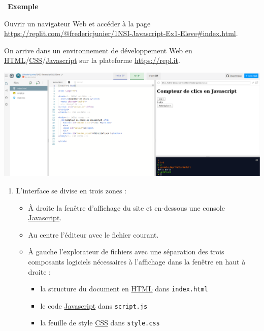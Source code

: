 \documentclass[
  11pt,
]{article}
\newcommand{\passthrough}[1]{#1}
\providecommand{\tightlist}{%
  \setlength{\itemsep}{0pt}\setlength{\parskip}{0pt}}
\newcounter{exo}
\newcounter{def}
\newcounter{exple}
\newenvironment{exemple}[1]
{\par \medskip   \addtocounter{exple}{1} \noindent  
\begin{bclogo}[arrondi =0.1,   noborder = true, logo=\bclampe, marge=4]{~\textbf{Exemple} \textbf{\theexple} {\itshape #1} }  \par}
{
\end{bclogo}
 \par \bigskip }
\newcounter{logi}
\begin{document}
\begin{exemple}{}

Ouvrir un navigateur Web et accéder à la page
\url{https://replit.com/@fredericjunier/1NSI-Javascript-Ex1-Eleve\#index.html}.

On arrive dans un environnement de développement Web en
\href{https://developer.mozilla.org/fr/docs/Glossaire/HTML}{HTML}/\href{https://developer.mozilla.org/fr/docs/Glossaire/CSS}{CSS}/\href{https://developer.mozilla.org/fr/docs/Glossaire/JavaScript}{Javascript}
sur la plateforme \url{https://repl.it}.

\includegraphics{images/exo4-fig1.png}\\

\begin{enumerate}
\def\labelenumi{\arabic{enumi}.}
\item
  L'interface se divise en trois zones :

  \begin{itemize}
  \item
    À droite la fenêtre d'affichage du site et en-dessous une console
    \href{https://developer.mozilla.org/fr/docs/Glossaire/JavaScript}{Javascript}.
  \item
    Au centre l'éditeur avec le fichier courant.
  \item
    À gauche l'explorateur de fichiers avec une séparation des trois
    composants logiciels nécessaires à l'affichage dans la fenêtre en
    haut à droite :

    \begin{itemize}
    \tightlist
    \item
      la structure du document en
      \href{https://developer.mozilla.org/fr/docs/Glossaire/HTML}{HTML}
      dans \passthrough{\lstinline!index.html!}
    \item
      le code
      \href{https://developer.mozilla.org/fr/docs/Glossaire/JavaScript}{Javascript}
      dans \passthrough{\lstinline!script.js!}
    \item
      la feuille de style
      \href{https://developer.mozilla.org/fr/docs/Glossaire/CSS}{CSS}
      dans \passthrough{\lstinline!style.css!}
    \end{itemize}


\end{itemize}
\end{enumerate}
\end{exemple}
\end{document}
